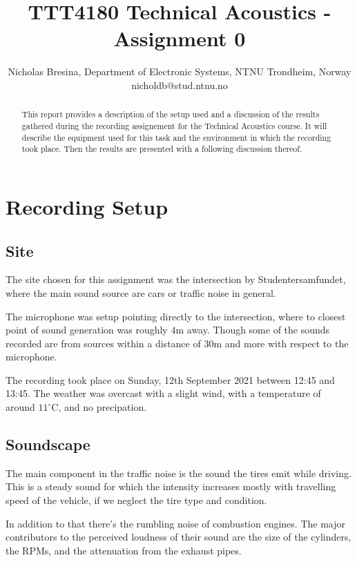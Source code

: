 \documentclass[twocolumn]{article}
\begin{document}
\title{TTT4180 Technical Acoustics - Assignment 0}

\author{Nicholas Bresina, Department of Electronic Systems, NTNU Trondheim, Norway \\
nicholdb@stud.ntnu.no}

\maketitle\thispagestyle{empty}

\begin{abstract}
This report provides a description of the setup used and a discussion of the results gathered during the
recording assignement for the Technical Acoustics course.
It will describe the equipment used for this task and the environment in which the recording took place.
Then the results are presented with a following discussion thereof.
\end{abstract}

\section{Recording Setup}
\subsection{Site}
The site chosen for this assignment was the intersection by Studentersamfundet, where the main sound source
are cars or traffic noise in general.

The microphone was setup pointing directly to the intersection, where to closest point of sound generation
was roughly $4\textrm{m}$ away.
Though some of the sounds recorded are from sources within a distance of $30\textrm{m}$ and more with respect
to the microphone.

The recording took place on Sunday, 12th September 2021 between 12:45 and 13:45.
The weather was overcast with a slight wind, with a temperature of  around $11^\circ\textrm{C}$,
and no precipation.

\subsection{Soundscape}
The main component in the traffic noise is the sound the tires emit while driving.
This is a steady sound for which the intensity increases mostly with travelling speed of the vehicle, if we
neglect the tire type and condition.

In addition to that there's the rumbling noise of combustion engines.
The major contributors to the perceived loudness of their sound are the size of the cylinders, the RPMs, and
the attenuation from the exhaust pipes.
\end{document}

